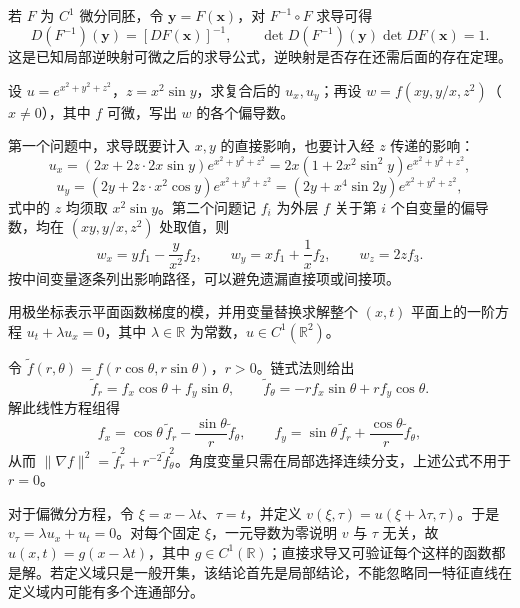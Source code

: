 \documentclass[UTF8,12pt,a4paper,fontset=fandol]{ctexbook}
\begin{document}
若 $F$ 为 $C^1$ 微分同胚，令 $\boldsymbol y=F(\boldsymbol x)$，对 $F^{-1}\circ F$ 求导可得
\begin{equation}
\label{eq:inverse-derivative-ch14}
    D(F^{-1})(\boldsymbol y)=[DF(\boldsymbol x)]^{-1},\qquad
    \det D(F^{-1})(\boldsymbol y)\det DF(\boldsymbol x)=1.
\end{equation}
这是已知局部逆映射可微之后的求导公式，逆映射是否存在还需后面的存在定理。

\begin{example}
\label{ex:chain-rule-explicit-abstract-ch14}
设 $u=e^{x^2+y^2+z^2}$，$z=x^2\sin y$，求复合后的 $u_x,u_y$；再设 $w=f(xy,y/x,z^2)$（$x\ne0$），其中 $f$ 可微，写出 $w$ 的各个偏导数。
\end{example}
\begin{solve}
第一个问题中，求导既要计入 $x,y$ 的直接影响，也要计入经 $z$ 传递的影响：
\[
    u_x=(2x+2z\cdot2x\sin y)e^{x^2+y^2+z^2}
        =2x(1+2x^2\sin^2y)e^{x^2+y^2+z^2},
\]
\[
    u_y=(2y+2z\cdot x^2\cos y)e^{x^2+y^2+z^2}
        =(2y+x^4\sin2y)e^{x^2+y^2+z^2},
\]
式中的 $z$ 均须取 $x^2\sin y$。第二个问题记 $f_i$ 为外层 $f$ 关于第 $i$ 个自变量的偏导数，均在 $(xy,y/x,z^2)$ 处取值，则
\[
    w_x=yf_1-\frac{y}{x^2}f_2,\qquad
    w_y=xf_1+\frac1x f_2,\qquad
    w_z=2zf_3.
\]
按中间变量逐条列出影响路径，可以避免遗漏直接项或间接项。
\end{solve}

\begin{example}
\label{ex:polar-gradient-and-transport-ch14}
用极坐标表示平面函数梯度的模，并用变量替换求解整个 $(x,t)$ 平面上的一阶方程 $u_t+\lambda u_x=0$，其中 $\lambda\in\mathbb R$ 为常数，$u\in C^1(\mathbb R^2)$。
\end{example}
\begin{solve}
令 $\widetilde f(r,\theta)=f(r\cos\theta,r\sin\theta)$，$r>0$。链式法则给出
\[
    \widetilde f_r=f_x\cos\theta+f_y\sin\theta,\qquad
    \widetilde f_\theta=-rf_x\sin\theta+rf_y\cos\theta.
\]
解此线性方程组得
\[
    f_x=\cos\theta\,\widetilde f_r-\frac{\sin\theta}{r}\widetilde f_\theta,
    \qquad
    f_y=\sin\theta\,\widetilde f_r+\frac{\cos\theta}{r}\widetilde f_\theta,
\]
从而 $\|\nabla f\|^2=\widetilde f_r^2+r^{-2}\widetilde f_\theta^2$。角度变量只需在局部选择连续分支，上述公式不用于 $r=0$。

对于偏微分方程，令 $\xi=x-\lambda t$、$\tau=t$，并定义 $v(\xi,\tau)=u(\xi+\lambda\tau,\tau)$。于是 $v_\tau=\lambda u_x+u_t=0$。对每个固定 $\xi$，一元导数为零说明 $v$ 与 $\tau$ 无关，故 $u(x,t)=g(x-\lambda t)$，其中 $g\in C^1(\mathbb R)$；直接求导又可验证每个这样的函数都是解。若定义域只是一般开集，该结论首先是局部结论，不能忽略同一特征直线在定义域内可能有多个连通部分。
\end{solve}
\end{document}

